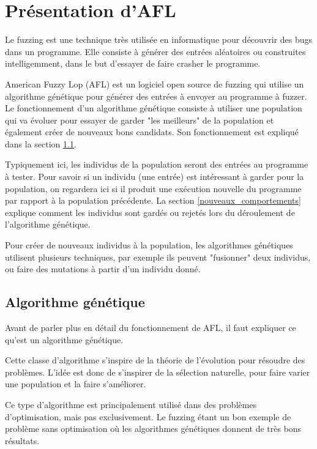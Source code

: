 \chapter{Présentation d'AFL}

Le fuzzing est une technique très utilisée en informatique pour découvrir
des bugs dans un programme. Elle consiste à générer des entrées aléatoires
ou construites intelligemment, dans le but d'essayer de faire crasher le
programme.

American Fuzzy Lop (AFL) est un logiciel open source de fuzzing qui utilise
un algorithme génétique pour générer des entrées à envoyer au programme à
fuzzer. Le fonctionnement d'un algorithme génétique consiste à utiliser
une population qui va évoluer pour essayer de garder "les meilleurs" de la
population et également créer de nouveaux bons candidats. Son fonctionnement
est expliqué dans la section \ref{genetique}.

Typiquement ici, les individus de la population seront des entrées au
programme à tester. Pour savoir si un individu (une entrée) est intéressant
à garder pour la population, on regardera ici si il produit une
exécution nouvelle du programme par rapport à la population précédente. La
section \ref{nouveaux_comportements} explique comment les individus sont
gardés ou rejetés lors du déroulement de l'algorithme génétique.

Pour créer de nouveaux individus à la population, les algorithmes
génétiques utilisent plusieurs techniques, par exemple ils peuvent
"fusionner" deux individus, ou faire des mutations à partir d'un individu
donné.

\section{Algorithme génétique}\label{genetique}

Avant de parler plus en détail du fonctionnement de AFL, il faut expliquer
ce qu'est un algorithme génétique.

Cette classe d'algorithme s'inspire de la théorie de l'évolution pour
résoudre des problèmes. L'idée est donc de s'inspirer de la sélection
naturelle, pour faire varier une population et la faire s'améliorer.

Ce type d'algorithme est principalement utilisé dans des problèmes
d'optimisation, mais pas exclusivement. Le fuzzing étant un bon exemple
de problème sans optimisation où les algorithmes génétiques donnent de
très bons résultats.

